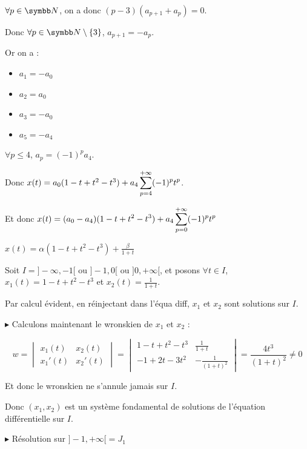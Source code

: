 \begin{exemple}
    $\forall p \in \N$, on a donc $(p - 3)(a_{p + 1} + a_p) = 0$.

    Donc $\forall p \in \N \setminus \{ 3 \}$, $a_{p + 1} = - a_p$. 

    Or on a : 
    \begin{itemize}
        \item $a_1 = -a_0$
        \item $a_2 = a_0$
        \item $a_3 = -a_0$
        \item $a_5 = -a_4$
    \end{itemize}

    $\forall p \leqslant 4$, $a_p = (-1)^p a_4$. 

    Donc $x(t) = a_0 (1 -t + t^2 - t^3) + a_4 \displaystyle \sum_{p = 4}^{+ \infty} (-1)^p t^p$.

    Et donc $x(t) = \displaystyle (a_0 - a_4)(1 - t + t^2 - t^3) + a_4 \sum_{p = 0}^{+ \infty} (-1)^p t^p$

    $x(t) = \alpha (1 - t + t^2 - t^3) + \frac \beta {1 + t}$

    Soit $I = ] - \infty, -1[$ ou $ ]-1, 0[$ ou $] 0, + \infty[$, et posons 
    $\forall t \in I$, $x_1(t) = 1 - t + t^2 - t^3$ et $x_2(t) = \frac 1 {1 + t}$. 

    Par calcul évident, en réinjectant dans l'équa diff, $x_1$ et $x_2$ sont solutions
    sur $I$.

    \avspace $\blacktriangleright$ Calculons maintenant le wronskien de $x_1$ et $x_2$ :

    $$w = \begin{vmatrix}
        x_1(t) & x_2(t) \\
        x_1'(t) & x_2'(t)
    \end{vmatrix} = \begin{vmatrix}
        1 - t + t^2 - t^3 & \frac 1 {1 + t} \\
        -1 + 2t - 3t^2 & -\frac 1 {(1 + t)^2}
    \end{vmatrix} = \frac {4t^3} {(1 + t)^2} \neq 0$$

    Et donc le wronskien ne s'annule jamais sur $I$. 

    Donc $(x_1, x_2)$ est un système fondamental de solutions de l'équation différentielle sur $I$.

    \lvspace \avspace {}

    \lvspace $\blacktriangleright$ Résolution sur $]-1, +\infty[ = J_1$


\end{exemple}
